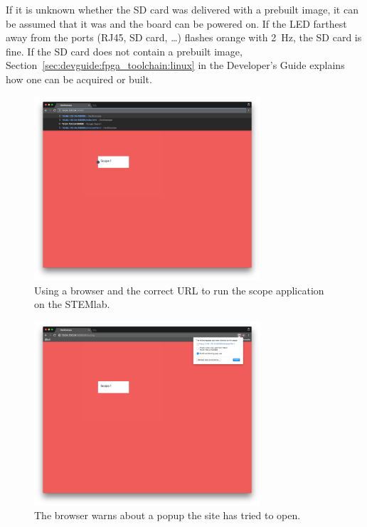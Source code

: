 If it  is unknown  whether the  SD card  was delivered  with a  prebuilt image,
it  can  be  assumed  that  it  was  and  the  board  can  be  powered  on. If
the  LED  farthest away  from  the  ports (RJ45,  SD  card,  \ldots )  flashes
orange  with \SI{2}{\Hz},  the SD  card  is fine.   If  the SD  card does  not
contain a  prebuilt image,  Section~\ref{sec:devguide:fpga_toolchain:linux} in
the Developer's Guide explains how one can be acquired or built.

\begin{figure}
    \centering
    \includegraphics[width=0.75\textwidth]{images/userguide/url}
    \caption[Entering the URL]{%
        Using a browser and the correct URL to run the scope application on
        the STEMlab.
    }
    \label{fig:userguide:url}
\end{figure}

\begin{figure}
    \centering
    \includegraphics[width=0.75\textwidth]{images/userguide/popup_warn}
    \caption[The popup warn popup]{%
        The browser warns about a popup the site has tried to open.
    }
    \label{fig:userguide:popup:warn}
\end{figure}

